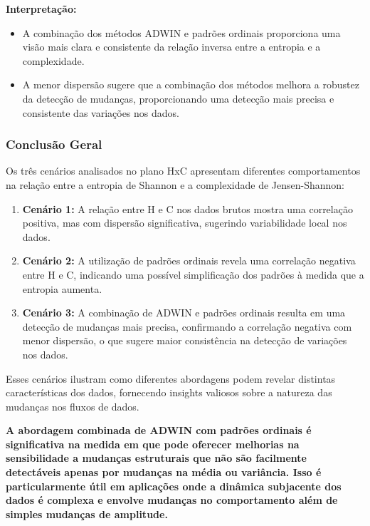 \documentclass[
]{article}
\begin{document}
\textbf{Interpretação:}

\begin{itemize}
\item
  A combinação dos métodos ADWIN e padrões ordinais proporciona uma
  visão mais clara e consistente da relação inversa entre a entropia e a
  complexidade.
\item
  A menor dispersão sugere que a combinação dos métodos melhora a
  robustez da detecção de mudanças, proporcionando uma detecção mais
  precisa e consistente das variações nos dados.
\end{itemize}

\hypertarget{conclusuxe3o-geral}{%
\subsubsection{Conclusão Geral}\label{conclusuxe3o-geral}}

Os três cenários analisados no plano HxC apresentam diferentes
comportamentos na relação entre a entropia de Shannon e a complexidade
de Jensen-Shannon:

\begin{enumerate}
\def\labelenumi{\arabic{enumi}.}
\item
  \textbf{Cenário 1:} A relação entre H e C nos dados brutos mostra uma
  correlação positiva, mas com dispersão significativa, sugerindo
  variabilidade local nos dados.
\item
  \textbf{Cenário 2:} A utilização de padrões ordinais revela uma
  correlação negativa entre H e C, indicando uma possível simplificação
  dos padrões à medida que a entropia aumenta.
\item
  \textbf{Cenário 3:} A combinação de ADWIN e padrões ordinais resulta
  em uma detecção de mudanças mais precisa, confirmando a correlação
  negativa com menor dispersão, o que sugere maior consistência na
  detecção de variações nos dados.
\end{enumerate}

Esses cenários ilustram como diferentes abordagens podem revelar
distintas características dos dados, fornecendo insights valiosos sobre
a natureza das mudanças nos fluxos de dados.

\textbf{A abordagem combinada de ADWIN com padrões ordinais é
significativa na medida em que pode oferecer melhorias na sensibilidade
a mudanças estruturais que não são facilmente detectáveis apenas por
mudanças na média ou variância. Isso é particularmente útil em
aplicações onde a dinâmica subjacente dos dados é complexa e envolve
mudanças no comportamento além de simples mudanças de amplitude.}
\end{document}

